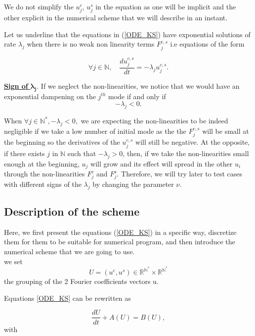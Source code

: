 \documentclass[12pt]{article}
\begin{document}
We do not simplify the $u_j^c$, $u_j^s$ in the equation as one will be implicit and the other explicit in the 
 numerical scheme that we will describe in an instant. 

Let us underline that the equations in (\ref{ODE_KS}) have exponential solutions of rate $\lambda_j$ when there is no weak non linearity 
terms $F_j^{c,s}$ i.e equations of the form 

\begin{equation}\label{KS_exponential_ODE}
    \forall j\in \mathbb{N}, \quad \frac{du_j^{c,s}}{dt} = -\lambda_ju_j^{c,s}.
\end{equation}

\underline{\textbf{Sign of} $\boldsymbol{\lambda_j}.$} If we neglect the non-linearities, we notice that we would have an exponential
 dampening on the $j^{th}$ mode if and only if $$-\lambda_j < 0. $$

When $\forall j \in \mathbb{N}^*,-\lambda_j <0,$ we are expecting the non-linearities to be indeed negligible if we take a low number of 
initial mode as the the $F_j^{c,s}$ will be small at the beginning so the derivatives of the $u_j^{c,s}$ will still be negative. 
At the opposite, if there exists $j$ in  $\mathbb{N}$ such that $-\lambda_j >0$, then, if we take the non-linearities small enough at the beginning,
$u_j$ will grow and its effect will spread in the other $u_i$ through the non-linearities $F_j^c$ and $F_j^s$. Therefore, we will try 
later to test cases with different signs of the $\lambda_j$ by changing the parameter $\nu$.



\subsection{Description of the scheme}

Here, we first present the equations (\ref{ODE_KS}) in a specific way, discretize them for them to be suitable for numerical program, 
and then introduce the numerical scheme that we are going to use. 
\\

we set 
\begin{equation}
    U = (u^c, u^s) \in \mathbb{R}^{\mathbb{N}^*} \times\mathbb{R}^{\mathbb{N}^*}
\end{equation} the grouping of the 2 Fourier coefficients vectors u.

Equations \eqref{ODE_KS} can be rewritten as 

\begin{equation}
    \frac{dU}{dt} + A(U) = B(U),
\end{equation}
with 
\end{document}

